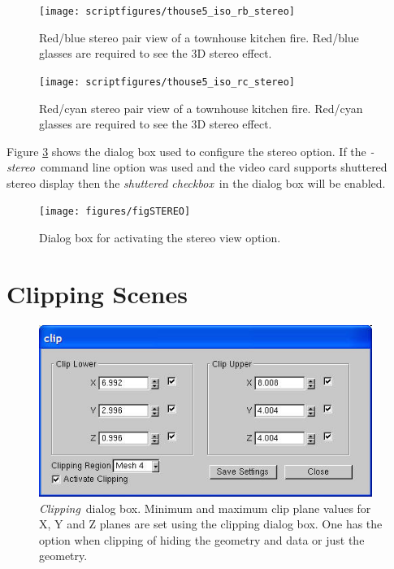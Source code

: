 \documentclass[11pt,twoside]{book}
\newcommand{\figoptions}{hbp}
\begin{document}
\begin{figure}[\figoptions]
\begin{center}
\texttt{[image: scriptfigures/thouse5\_iso\_rb\_stereo]}\\
\caption[Red/blue stereo pair view of a townhouse kitchen fire.]{
Red/blue stereo pair view of a townhouse kitchen fire. Red/blue glasses are required to see the 3D stereo
effect.
}
\label{figrbstereo}
\end{center}
\end{figure}

\begin{figure}[\figoptions]
\begin{center}
\texttt{[image: scriptfigures/thouse5\_iso\_rc\_stereo]}\\
\caption[Red/cyan stereo pair view of a townhouse kitchen fire.]{
Red/cyan stereo pair view of a townhouse kitchen fire. Red/cyan glasses are required to see the 3D stereo
effect.
}
\label{figrcstereo}
\end{center}
\end{figure}

Figure \ref{figstereodialog} shows the dialog
box used to configure the stereo option.  If the {\em -stereo}\ command line option was used and
the video card supports shuttered stereo display then the {\em shuttered checkbox}\ in the dialog box will be enabled.

\begin{figure}[\figoptions]
\begin{center}
\texttt{[image: figures/figSTEREO]}
\caption{Dialog
box for activating the stereo view option.}
\label{figstereodialog}
\end{center}
\end{figure}
\section{Clipping Scenes}


\begin{figure}[\figoptions]
\begin{center}
\includegraphics[width=4.2708333in]{figures/figCLIP}
\end{center}
\caption[{\em Clipping}\ dialog box.]{{\em Clipping}\ dialog box.
Minimum and maximum clip plane values for X, Y and Z planes are set
using the clipping dialog box.  One has the option when clipping of
hiding the geometry and data
or just the geometry.
}
\label{figCLIP}
\end{figure}
\end{document}
